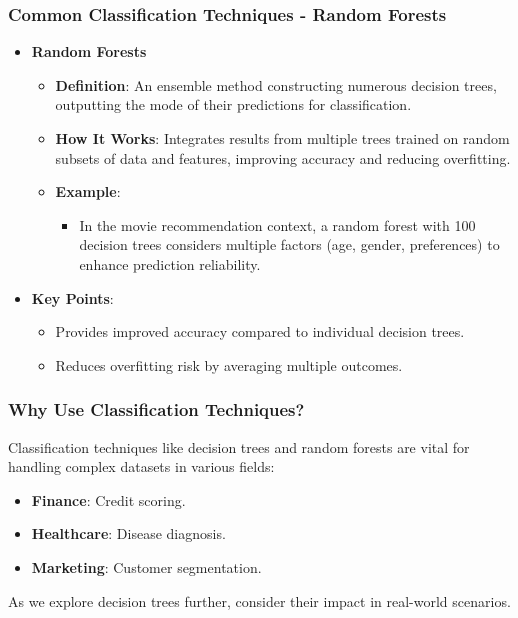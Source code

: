\documentclass[aspectratio=169]{beamer}
\begin{document}
\begin{frame}[fragile]
    \frametitle{Common Classification Techniques - Random Forests}
    \begin{itemize}
        \item \textbf{Random Forests}
        \begin{itemize}
            \item \textbf{Definition}: An ensemble method constructing numerous decision trees, outputting the mode of their predictions for classification.
            \item \textbf{How It Works}: Integrates results from multiple trees trained on random subsets of data and features, improving accuracy and reducing overfitting.
            \item \textbf{Example}: 
            \begin{itemize}
                \item In the movie recommendation context, a random forest with 100 decision trees considers multiple factors (age, gender, preferences) to enhance prediction reliability.
            \end{itemize}
        \end{itemize}
        
        \item \textbf{Key Points}:
        \begin{itemize}
            \item Provides improved accuracy compared to individual decision trees.
            \item Reduces overfitting risk by averaging multiple outcomes.
        \end{itemize}
    \end{itemize}
\end{frame}

\begin{frame}[fragile]
    \frametitle{Why Use Classification Techniques?}
    Classification techniques like decision trees and random forests are vital for handling complex datasets in various fields:
    \begin{itemize}
        \item \textbf{Finance}: Credit scoring.
        \item \textbf{Healthcare}: Disease diagnosis.
        \item \textbf{Marketing}: Customer segmentation.
    \end{itemize}
    
    As we explore decision trees further, consider their impact in real-world scenarios.
\end{frame}
\end{document}
